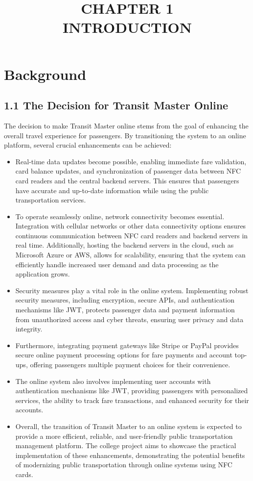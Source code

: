 \documentclass[a4paper, 12pt]{article}
\title{CHAPTER 1 \\ INTRODUCTION}
\author{}
\date{}
\begin{document}
\maketitle

\section{Background}

\subsection*{1.1 The Decision for Transit Master Online}
The decision to make Transit Master online stems from the goal of enhancing the overall travel experience for passengers. By transitioning the system to an online platform, several crucial enhancements can be achieved:
\begin{itemize}
  \item Real-time data updates become possible, enabling immediate fare validation, card balance updates, and synchronization of passenger data between NFC card readers and the central backend servers. This ensures that passengers have accurate and up-to-date information while using the public transportation services.
  \item To operate seamlessly online, network connectivity becomes essential. Integration with cellular networks or other data connectivity options ensures continuous communication between NFC card readers and backend servers in real time. Additionally, hosting the backend servers in the cloud, such as Microsoft Azure or AWS, allows for scalability, ensuring that the system can efficiently handle increased user demand and data processing as the application grows.
  \item Security measures play a vital role in the online system. Implementing robust security measures, including encryption, secure APIs, and authentication mechanisms like JWT, protects passenger data and payment information from unauthorized access and cyber threats, ensuring user privacy and data integrity.
  \item Furthermore, integrating payment gateways like Stripe or PayPal provides secure online payment processing options for fare payments and account top-ups, offering passengers multiple payment choices for their convenience.
  \item The online system also involves implementing user accounts with authentication mechanisms like JWT, providing passengers with personalized services, the ability to track fare transactions, and enhanced security for their accounts.
  \item Overall, the transition of Transit Master to an online system is expected to provide a more efficient, reliable, and user-friendly public transportation management platform. The college project aims to showcase the practical implementation of these enhancements, demonstrating the potential benefits of modernizing public transportation through online systems using NFC cards.
\end{itemize}
\end{document}
